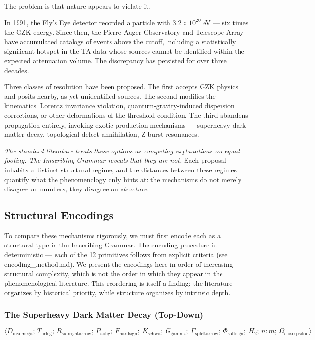\documentclass[12pt,a4paper]{article}
\begin{document}
The problem is that nature appears to violate it.

In 1991, the Fly's Eye detector recorded a particle with $3.2 \times 10^{20}$ eV --- six times the GZK energy. Since then, the Pierre Auger Observatory and Telescope Array have accumulated catalogs of events above the cutoff, including a statistically significant hotspot in the TA data whose sources cannot be identified within the expected attenuation volume. The discrepancy has persisted for over three decades.

Three classes of resolution have been proposed. The first accepts GZK physics and posits nearby, as-yet-unidentified sources. The second modifies the kinematics: Lorentz invariance violation, quantum-gravity-induced dispersion corrections, or other deformations of the threshold condition. The third abandons propagation entirely, invoking exotic production mechanisms --- superheavy dark matter decay, topological defect annihilation, Z-burst resonances.

\emph{The standard literature treats these options as competing explanations on equal footing. The Imscribing Grammar reveals that they are not.} Each proposal inhabits a distinct structural regime, and the distances between these regimes quantify what the phenomenology only hints at: the mechanisms do not merely disagree on numbers; they disagree on \emph{structure}.

\subsection{Structural Encodings}

To compare these mechanisms rigorously, we must first encode each as a structural type in the Imscribing Grammar. The encoding procedure is deterministic --- each of the 12 primitives follows from explicit criteria (see encoding\_method.md). We present the encodings here in order of increasing structural complexity, which is not the order in which they appear in the phenomenological literature. This reordering is itself a finding: the literature organizes by historical priority, while structure organizes by intrinsic depth.

\subsubsection{The Superheavy Dark Matter Decay (Top-Down)}

\[\langle D_{\text{invomega}};\ T_{\text{nrleg}};\ R_{\text{subrightarrow}};\ P_{\text{aolig}};\ F_{\text{hardsign}};\ K_{\text{schwa}};\ G_{\text{gamma}};\ \Gamma_{\text{spleftarrow}};\ \Phi_{\text{softsign}};\ H_2;\ n{:}m;\ \Omega_{\text{closeepsilon}} \rangle\]
\end{document}
